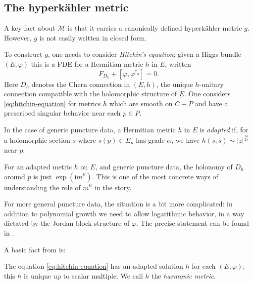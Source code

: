 \documentclass[12pt,letterpaper,reqno]{article}
\numberwithin{equation}{section}
\newcommand{\cM}{\ensuremath{\mathcal M}}
\newcommand{\R}{\ensuremath{\mathbb R}}
\newcommand{\hk}{hyperk\"ahler\xspace}
\newcommand{\I}{{\mathrm i}}
\newcommand{\abs}[1]{\lvert#1\rvert}
\newcommand{\ti}[1]{\textit{#1}}
\begin{document}
\subsection{The \hk metric}

A key fact about $\cM$ is that it carries a canonically
defined \hk metric $g$. However, $g$ is not easily
written in closed form.

To construct $g$, one needs to consider \ti{Hitchin's equation}:
given a Higgs bundle $(E,\varphi)$ this is a PDE
for a Hermitian metric $h$ in $E$, written
\begin{equation} \label{eq:hitchin-equation}
  F_{D_h} + [\varphi, \varphi^{\dagger_h}] = 0.
\end{equation}
Here $D_h$ denotes the Chern connection in $(E,h)$,
the unique $h$-unitary connection compatible with
the holomorphic structure of $E$.
One considers \eqref{eq:hitchin-equation} for
metrics $h$ which are smooth on $C - P$ and
have a prescribed singular behavior near each
$p \in P$.
\begin{defn} 
In the case of generic puncture data, a Hermitian metric $h$
in $E$ is \ti{adapted} if, for a holomorphic section $s$ 
where $s(p) \in E_p$ has grade $\alpha$, we have
$h(s,s) \sim \abs{z}^{\frac{2 \alpha}{2\pi}}$ near $p$.
\end{defn}

\begin{remark}
For an adapted metric $h$ on $E$, and generic puncture data, 
the holonomy of $D_h$ around $p$
is just $\exp(\I m^\R)$. This is one of the most concrete ways
of understanding the role of $m^\R$ in the story.
\end{remark}

For more general puncture data, the situation is a bit 
more complicated: in addition to polynomial growth
we need to allow logarithmic behavior, in a way dictated
by the Jordan block structure of $\varphi$.
The precise statement can be found in \cite{hbnc}.

A basic fact from \cite{hbnc} is:
\begin{thm} \label{thm:hitchin-existence}
The equation \eqref{eq:hitchin-equation} has an
adapted solution $h$ for each $(E,\varphi)$;
this $h$ is unique up to scalar multiple.
We call $h$ the \ti{harmonic metric}.
\end{thm}
\end{document}
